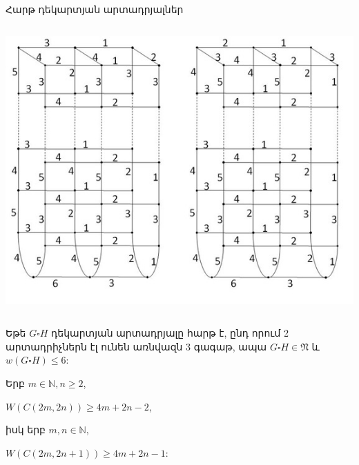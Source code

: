 \begin{frame}[squeeze]{Հարթ դեկարտյան արտադրյալներ}
\begin{columns}
\begin{column}{0.3\textwidth}
\includegraphics[width=\textwidth,trim={9cm 0 0 0},clip]{figures/cylinders.jpg}
\end{column}
\end{columns}

\begin{hide}
\begin{theorem}
\label{t2_planars} Եթե $G\square H$ դեկարտյան արտադրյալը հարթ է, ընդ որում 2 արտադրիչներն էլ ունեն առնվազն $3$ գագաթ, ապա $G\square H\in \mathfrak{N}$ և $w(G\square H)\leq 6$:
\end{theorem}
\end{hide}

\begin{hide}
\begin{theorem} Երբ $m\in\mathbb{N},n\geq 2$, 
\begin{center}
$W(C(2m,2n))\geq 4m+2n-2$,
\end{center}
իսկ երբ $m,n\in\mathbb{N}$,
\begin{center}
$W(C(2m,2n+1))\geq 4m+2n-1$:
\end{center}
\end{theorem}
\end{hide}

\end{frame}

